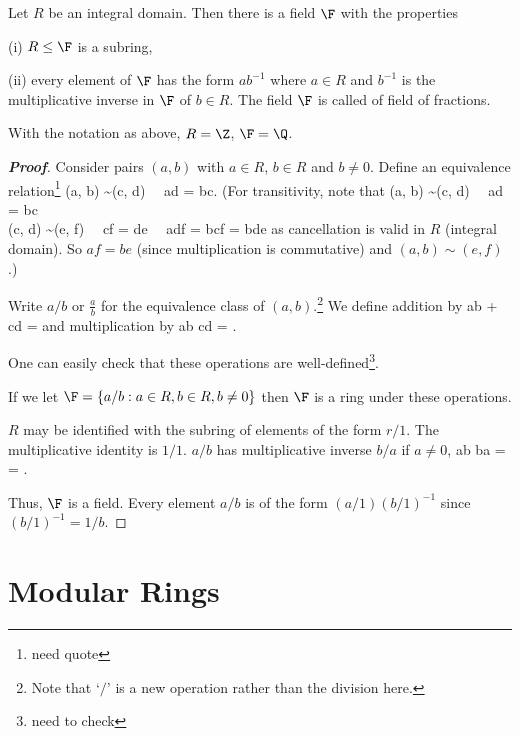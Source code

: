 \begin{theorem}\label{def:field_of_fractions}
Let $R$ be an integral domain. Then there is a field $\F$ with the properties
\ben
\item [(i)] $R \leq \F$ is a subring,%
\item [(ii)] every element of $\F$ has the form $ab^{-1}$ where $a \in R$ and $b^{-1}$ is the multiplicative inverse in $\F$ of $b \in R$.
\een
The field $\F$ is called of field of fractions.
\end{theorem}

\begin{example}
With the notation as above, $R = \Z$, $\F = \Q$.
\end{example}



\begin{proof}[\bf Proof]
Consider pairs $(a, b)$ with $a \in R$, $b \in R$ and $b \neq 0$. Define an equivalence relation\footnote{need quote}
\be
(a, b) \sim (c, d) \ \lra \ ad = bc.
\ee
(For transitivity, note that
\be
{}
(a, b) \sim (c, d) \ \lra \ ad = bc\\
(c, d) \sim (e, f) \ \lra\ cf = de
\ea \ \ra \ adf = bcf = bde
\ee
as cancellation is valid in $R$ (integral domain). So $af = be$ (since multiplication is commutative) and $(a, b) \sim (e, f)$.)

Write $a/b$ or $\frac ab$ for the equivalence class of $(a, b)$.\footnote{Note that `$/$' is a new operation rather than the division here.} We define addition by
\be
\frac ab + \frac cd = 
\ee
and multiplication by
\be
\frac ab \cdot \frac cd = .
\ee

One can easily check that these operations are well-defined\footnote{need to check}.

If we let $\F = \{a/b : a \in R, b \in R, b \neq 0\}$ then $\F$ is a ring under these operations.

$R$ may be identified with the subring of elements of the form $r/1$. The multiplicative identity is $1/1$. $a/b$ has multiplicative inverse $b/a$ if $a \neq 0$,
\be
\frac ab \frac ba =  = .
\ee

Thus, $\F$ is a field. Every element $a/b$ is of the form $(a/1)(b/1)^{-1}$ since $(b/1)^{-1} = 1/b$.
\end{proof}


\section{Modular Rings}

